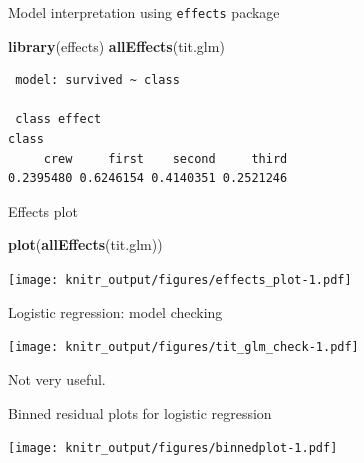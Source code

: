 \documentclass[10pt,ignorenonframetext,]{beamer}
\newenvironment{Shaded}{\begin{snugshade}}{\end{snugshade}}
\newcommand{\KeywordTok}[1]{\textcolor[rgb]{0.13,0.29,0.53}{\textbf{{#1}}}}
\newcommand{\DataTypeTok}[1]{\textcolor[rgb]{0.13,0.29,0.53}{{#1}}}
\newcommand{\StringTok}[1]{\textcolor[rgb]{0.31,0.60,0.02}{{#1}}}
\newcommand{\NormalTok}[1]{{#1}}
\begin{document}
\begin{frame}[fragile]{Model interpretation using \texttt{effects}
package}

\begin{Shaded}
\begin{Highlighting}[]
\KeywordTok{library}\NormalTok{(effects)}
\KeywordTok{allEffects}\NormalTok{(tit.glm)}
\end{Highlighting}
\end{Shaded}

\begin{verbatim}
 model: survived ~ class

 class effect
class
     crew     first    second     third 
0.2395480 0.6246154 0.4140351 0.2521246 
\end{verbatim}

\end{frame}

\begin{frame}[fragile]{Effects plot}

\begin{Shaded}
\begin{Highlighting}[]
\KeywordTok{plot}\NormalTok{(}\KeywordTok{allEffects}\NormalTok{(tit.glm))}
\end{Highlighting}
\end{Shaded}

\texttt{[image: knitr\_output/figures/effects\_plot-1.pdf]}

\end{frame}

\begin{frame}{Logistic regression: model checking}

\texttt{[image: knitr\_output/figures/tit\_glm\_check-1.pdf]}

Not very useful.

\end{frame}

\begin{frame}[fragile]{Binned residual plots for logistic regression}

\begin{Shaded}
\end{Shaded}

\texttt{[image: knitr\_output/figures/binnedplot-1.pdf]}

\end{frame}
\end{document}
